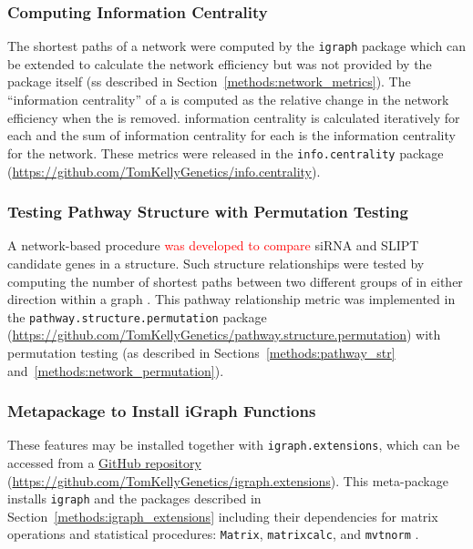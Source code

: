  
\subsubsection{Computing Information Centrality} 
The \glspl{shortest path} of a network were computed by the \texttt{igraph} package \citep{igraph} which can be extended to calculate the network efficiency but was not provided by the package itself (ss described in Section~\ref{methods:network_metrics}). The ``\gls{information centrality}'' of a  is computed as the relative change in the network efficiency when the  is removed. \Gls{information centrality} is calculated iteratively for each  and the sum of \gls{information centrality} for each  is the \gls{information centrality} for the network. These metrics were released in the \texttt{info.centrality} package (\url{https://github.com/TomKellyGenetics/info.centrality}).

\subsubsection{Testing Pathway Structure with Permutation Testing}
A network-based procedure \textcolor{red}{was developed to compare} \gls{siRNA} and \gls{SLIPT} candidate genes in a  structure. Such  structure relationships were tested by computing the number of \glspl{shortest path} between two different groups of  in either direction within a graph . This pathway relationship metric was implemented in the \texttt{pathway.structure.permutation} package (\url{https://github.com/TomKellyGenetics/pathway.structure.permutation}) with permutation testing (as described in Sections~\ref{methods:pathway_str} and~\ref{methods:network_permutation}). 

\subsubsection{Metapackage to Install iGraph Functions}
These features may be installed together with \texttt{igraph.extensions}, which can be accessed from a \href{https://github.com/TomKellyGenetics/igraph.extensions}{GitHub repository} (\url{https://github.com/TomKellyGenetics/igraph.extensions}). This meta-package installs \texttt{igraph} \citep{igraph} and the packages described in Section~\ref{methods:igraph_extensions} including their dependencies for matrix operations and statistical procedures: \texttt{Matrix}, \texttt{matrixcalc}, and \texttt{mvtnorm} \citep{Matrix, matrixcalc, Genz2009, mvtnorm}.


